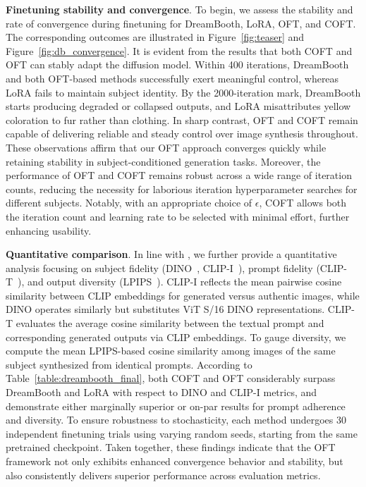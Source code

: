 \textbf{Finetuning stability and convergence}. To begin, we assess the stability and rate of convergence during finetuning for DreamBooth, LoRA, OFT, and COFT. The corresponding outcomes are illustrated in Figure~\ref{fig:teaser} and Figure~\ref{fig:db_convergence}. It is evident from the results that both COFT and OFT can stably adapt the diffusion model. Within 400 iterations, DreamBooth and both OFT-based methods successfully exert meaningful control, whereas LoRA fails to maintain subject identity. By the 2000-iteration mark, DreamBooth starts producing degraded or collapsed outputs, and LoRA misattributes yellow coloration to fur rather than clothing. In sharp contrast, OFT and COFT remain capable of delivering reliable and steady control over image synthesis throughout. These observations affirm that our OFT approach converges quickly while retaining stability in subject-conditioned generation tasks. Moreover, the performance of OFT and COFT remains robust across a wide range of iteration counts, reducing the necessity for laborious iteration hyperparameter searches for different subjects. Notably, with an appropriate choice of $\epsilon$, COFT allows both the iteration count and learning rate to be selected with minimal effort, further enhancing usability.

\textbf{Quantitative comparison}. In line with \cite{ruiz2023dreambooth}, we further provide a quantitative analysis focusing on subject fidelity (DINO~\cite{caron2021emerging}, CLIP-I~\cite{radford2021learning}), prompt fidelity (CLIP-T~\cite{radford2021learning}), and output diversity (LPIPS~\cite{zhang2018unreasonable}). CLIP-I reflects the mean pairwise cosine similarity between CLIP embeddings for generated versus authentic images, while DINO operates similarly but substitutes ViT S/16 DINO representations. CLIP-T evaluates the average cosine similarity between the textual prompt and corresponding generated outputs via CLIP embeddings. To gauge diversity, we compute the mean LPIPS-based cosine similarity among images of the same subject synthesized from identical prompts. According to Table~\ref{table:dreambooth_final}, both COFT and OFT considerably surpass DreamBooth and LoRA with respect to DINO and CLIP-I metrics, and demonstrate either marginally superior or on-par results for prompt adherence and diversity. To ensure robustness to stochasticity, each method undergoes 30 independent finetuning trials using varying random seeds, starting from the same pretrained checkpoint. Taken together, these findings indicate that the OFT framework not only exhibits enhanced convergence behavior and stability, but also consistently delivers superior performance across evaluation metrics.

